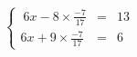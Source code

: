 \documentclass[preview]{standalone}
\begin{document}
\begin{align*}
\left\{ \begin{array}{cl} \ 6x - 8\times\frac{-7}{17} & = & 13 \\6x + 9\times\frac{-7}{17}& = &6 \end{array} \right.
\end{align*}
\end{document}
